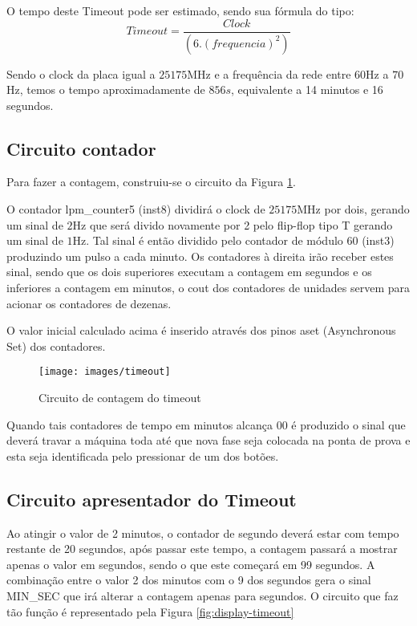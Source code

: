 \documentclass[12pt,a4paper,openany]{abntex2}
\begin{document}
O tempo deste Timeout pode ser estimado, sendo sua fórmula do tipo: $$Timeout = \frac{Clock}{\left(\left. 6 \right. . \left. \left(frequencia\right)^2\right.\right)}$$

Sendo o clock da placa igual a $25175$MHz e a frequência da rede entre $60$Hz a $70$Hz, temos o tempo aproximadamente de $856s$, equivalente a 14 minutos e 16 segundos.

\subsection{Circuito contador}

Para fazer a contagem, construiu-se o circuito da Figura \ref{fig:timeout}.

O contador lpm\_counter5 (inst8) dividirá o clock de $25175$MHz por dois, gerando um sinal de $2$Hz que será divido novamente por 2 pelo flip-flop tipo T gerando um sinal de $1$Hz. Tal sinal é então dividido pelo contador de módulo 60 (inst3) produzindo um pulso a cada minuto. Os contadores à direita irão receber estes sinal, sendo que os dois superiores executam a contagem em segundos e os inferiores a contagem em minutos, o cout dos contadores de unidades servem para acionar os contadores de dezenas.

O valor inicial calculado acima é inserido através dos pinos aset (Asynchronous Set) dos contadores.

\begin{figure}[!htp]
	\centering
	\caption{Circuito de contagem do timeout}
	\texttt{[image: images/timeout]}
	\label{fig:timeout}
\end{figure}

Quando tais contadores de tempo em minutos alcança 00 é produzido o sinal que deverá travar a máquina toda até que nova fase seja colocada na ponta de prova e esta seja identificada pelo pressionar de um dos botões.

\subsection{Circuito apresentador do Timeout}

Ao atingir o valor de 2 minutos, o contador de segundo deverá estar com tempo restante de 20 segundos, após passar este tempo, a contagem passará a mostrar apenas o valor em segundos, sendo o que este começará em 99 segundos. A combinação entre o valor 2 dos minutos com o 9 dos segundos gera o sinal MIN\_SEC que irá alterar a contagem apenas para segundos. O circuito que faz tão função é representado pela Figura \ref{fig:display-timeout}
\end{document}
